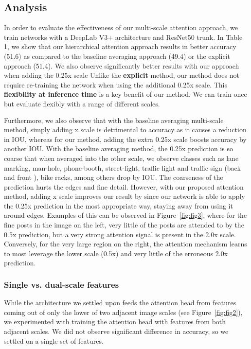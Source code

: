 \documentclass{article}
\begin{document}
\subsection{Analysis}

In order to evaluate the effectiveness of our multi-scale attention approach, we train networks with a DeepLab V3+ architecture and ResNet50 trunk. In Table 1, we show that our hierarchical attention approach results in better accuracy (51.6) as compared to the baseline averaging approach (49.4) or the explicit approach (51.4). We also observe significantly better results with our approach when adding the 0.25x scale Unlike the \textbf{explicit} method, our method does not require re-training the network when using the additional 0.25x scale. This \textbf{flexibility at inference time} is a key benefit of our method. We can train once but evaluate flexibly with a range of different scales.

Furthermore, we also observe that with the baseline averaging multi-scale method, simply adding x scale is detrimental to accuracy as it causes a  reduction in IOU, whereas for our method, adding the extra 0.25x scale boosts accuracy by another  IOU. With the baseline averaging method, the 0.25x prediction is so coarse that when averaged into the other scale, we observe classes such as lane marking, man-hole, phone-booth, street-light, traffic light and traffic sign (back and front ), bike racks, among others drop by  IOU. The coarseness of the prediction hurts the edges and fine detail. However, with our proposed attention method, adding x scale improves our result by  since our network is able to apply the 0.25x prediction in the most appropriate way, staying away from using it around edges. Examples of this can be observed in Figure~\ref{fig:fig3}, where for the fine posts in the image on the left, very little of the posts are attended to by the 0.5x prediction, but a very strong attention signal is present in the 2.0x scale. Conversely, for the very large region on the right, the attention mechanism learns to most leverage the lower scale (0.5x) and very little of the erroneous 2.0x prediction.

\subsubsection{Single vs. dual-scale features}
While the architecture we settled upon feeds the attention head from features coming out of only the lower of two adjacent image scales (see Figure~\ref{fig:fig2}), we experimented with training the attention head with features from both adjacent scales. We did not observe significant difference in accuracy, so we settled on a single set of features.
\end{document}

